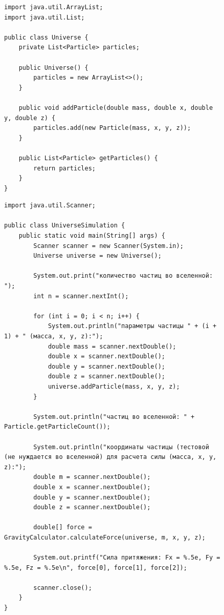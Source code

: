 \documentclass[a4paper, 14pt]{extarticle}
\begin{document}
\begin{figure}[!htb]
\begin{lstlisting}[language={},caption={класс},label={lst:code3}]
import java.util.ArrayList;
import java.util.List;

public class Universe {
    private List<Particle> particles;

    public Universe() {
        particles = new ArrayList<>();
    }

    public void addParticle(double mass, double x, double y, double z) {
        particles.add(new Particle(mass, x, y, z));
    }

    public List<Particle> getParticles() {
        return particles;
    }
}

\end{lstlisting}
\end{figure}

\begin{figure}[!htb]
\begin{lstlisting}[language={},caption={класс},label={lst:code4}]
import java.util.Scanner;

public class UniverseSimulation {
    public static void main(String[] args) {
        Scanner scanner = new Scanner(System.in);
        Universe universe = new Universe();

        System.out.print("количество частиц во вселенной: ");
        int n = scanner.nextInt();

        for (int i = 0; i < n; i++) {
            System.out.println("параметры частицы " + (i + 1) + " (масса, x, y, z):");
            double mass = scanner.nextDouble();
            double x = scanner.nextDouble();
            double y = scanner.nextDouble();
            double z = scanner.nextDouble();
            universe.addParticle(mass, x, y, z);
        }

        System.out.println("частиц во вселенной: " + Particle.getParticleCount());

        System.out.println("координаты частицы (тестовой (не нуждается во вселенной) для расчета силы (масса, x, y, z):");
        double m = scanner.nextDouble();
        double x = scanner.nextDouble();
        double y = scanner.nextDouble();
        double z = scanner.nextDouble();

        double[] force = GravityCalculator.calculateForce(universe, m, x, y, z);

        System.out.printf("Сила притяжения: Fx = %.5e, Fy = %.5e, Fz = %.5e\n", force[0], force[1], force[2]);

        scanner.close();
    }
}

\end{lstlisting}
\end{figure}
\end{document}
